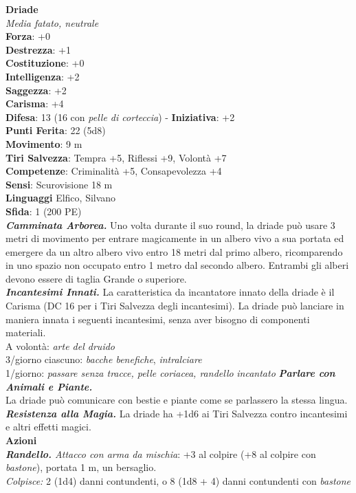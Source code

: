 \begin{multicols}{2}
\medskip\textbf{Driade}\\
\emph{Media fatato, neutrale}\\
\textbf{Forza}: +0\\
\textbf{Destrezza}: +1\\
\textbf{Costituzione}: +0\\
\textbf{Intelligenza}: +2\\
\textbf{Saggezza}: +2\\
\textbf{Carisma}: +4\\
\textbf{Difesa}: 13 (16 con \emph{pelle di corteccia}) - \textbf{Iniziativa}: +2\\
\textbf{Punti Ferita}: 22 (5d8)\\
\textbf{Movimento}: 9 m\\
\textbf{Tiri Salvezza}: Tempra +5, Riflessi +9, Volontà +7\\
\textbf{Competenze}: Criminalità +5, Consapevolezza +4\\
\textbf{Sensi}: Scurovisione 18 m\\
\textbf{Linguaggi} Elfico, Silvano\\
\textbf{Sfida}: 1 (200 PE)\smallskip\\
\emph{\textbf{Camminata Arborea.}} Uno volta durante il suo round, la driade può usare 3 metri di movimento per entrare magicamente in un albero vivo a sua portata ed emergere da un altro albero vivo entro 18 metri dal primo albero, ricomparendo in uno spazio non occupato entro 1 metro dal secondo albero. Entrambi gli alberi devono essere di taglia Grande o superiore.\\
\emph{\textbf{Incantesimi Innati.}} La caratteristica da incantatore innato della driade è il Carisma (DC  16 per i Tiri Salvezza degli incantesimi). La driade può lanciare in maniera innata i seguenti incantesimi, senza aver bisogno di componenti materiali.\\
A volontà: \emph{arte del druido}\\
3/giorno ciascuno: \emph{bacche benefiche}, \emph{intralciare}\\
1/giorno: \emph{passare senza tracce, pelle coriacea, randello} \emph{incantato} \emph{\textbf{Parlare con Animali e Piante.}}\\
La driade può comunicare con bestie e piante come se parlassero la stessa lingua.\\
\emph{\textbf{Resistenza alla Magia.}} La driade ha +1d6 ai Tiri Salvezza contro incantesimi e altri effetti magici.\\
\smallskip\textbf{Azioni}\\
\emph{\textbf{Randello.} Attacco con arma da mischia}: +3 al colpire (+8 al colpire con \emph{bastone}), portata 1 m, un bersaglio.\\
\emph{Colpisce:} 2 (1d4) danni contundenti, o 8 (1d8 + 4) danni contundenti con \emph{bastone}\\


\end{multicols}
